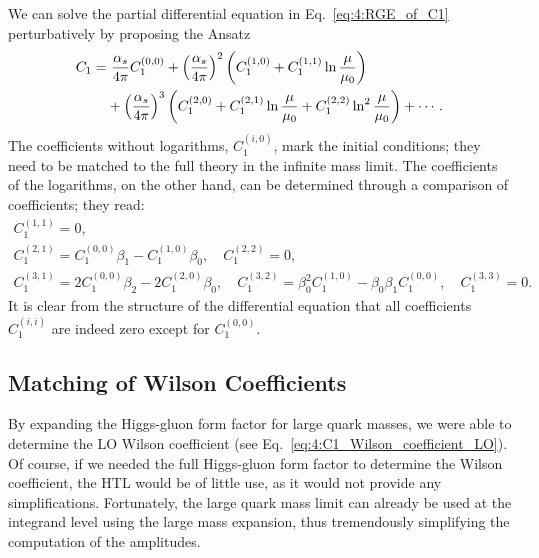 We can solve the partial differential equation in Eq.~\eqref{eq:4:RGE_of_C1} perturbatively by proposing the Ansatz
\begin{equation}
\begin{split}
C_1 =  &\ \frac{\alpha_s}{4 \pi} C_1^{(0,0)} + \left(\frac{\alpha_s}{4 \pi} \right)^2 \left(C_1^{(1,0)} + C_1^{(1, 1)} \ln \frac{\mu}{\mu_0} \right) \\
&+ \left(\frac{\alpha_s}{4 \pi} \right)^3 \left(C_1^{(2, 0)} + C_1^{(2, 1)} \ln \frac{\mu}{\mu_0} + C_1^{(2, 2)} \ln^2 \frac{\mu}{\mu_0} \right) + \cdots.
\end{split}
\end{equation}
The coefficients without logarithms, $C_1^{(i, 0)}$, mark the initial conditions; they need to be matched to the full theory in the infinite mass limit. The coefficients of the logarithms, on the other hand, can be determined through a comparison of coefficients; they read:
\begin{equation}
\begin{gathered}
C_1^{(1,1)} = 0, \\
C_1^{(2,1)} = C_1^{(0,0)} \beta_1 - C_1^{(1, 0)} \beta_0, \quad C_1^{(2, 2)} = 0, \\
C_1^{(3,1)} = 2 C_1^{(0,0)} \beta_2 - 2 C_1^{(2,0)} \beta_0, \quad C_1^{(3,2)} = \beta_0^2 C_1^{(1,0)} - \beta_0 \beta_1 C_1^{(0,0)}, \quad C_1^{(3, 3)} = 0.
\end{gathered}
\end{equation}
It is clear from the structure of the differential equation that all coefficients $C_1^{(i, i)}$ are indeed zero except for $C_1^{(0,0)}$.

\subsection{Matching of Wilson Coefficients} \label{subsec:4:matching_of_wilson_coefficients}
By expanding the Higgs-gluon form factor for large quark masses, we were able to determine the \acs{LO} Wilson coefficient (see Eq.~\eqref{eq:4:C1_Wilson_coefficient_LO}). Of course, if we needed the full Higgs-gluon form factor to determine the Wilson coefficient, the \acs{HTL} would be of little use, as it would not provide any simplifications. Fortunately, the large quark mass limit can already be used at the integrand level using the large mass expansion, thus tremendously simplifying the computation of the amplitudes.

